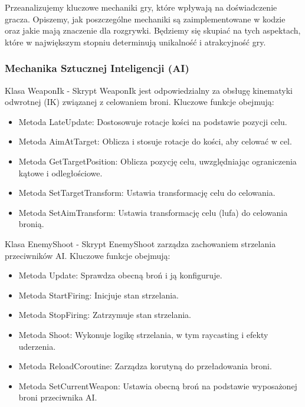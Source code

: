 Przeanalizujemy kluczowe mechaniki gry, które wpływają na doświadczenie gracza. Opiszemy, jak poszczególne mechaniki są zaimplementowane w kodzie oraz jakie mają znaczenie dla rozgrywki. Będziemy się skupiać na tych aspektach, które w największym stopniu determinują unikalność i atrakcyjność gry.

\subsubsection{Mechanika Sztucznej Inteligencji (AI)}

Klasa WeaponIk -
Skrypt WeaponIk jest odpowiedzialny za obsługę kinematyki odwrotnej (IK) związanej z celowaniem broni. Kluczowe funkcje obejmują:
\begin{itemize}
\item Metoda LateUpdate: Dostosowuje rotacje kości na podstawie pozycji celu.
\item Metoda AimAtTarget: Oblicza i stosuje rotacje do kości, aby celować w cel.
\item Metoda GetTargetPosition: Oblicza pozycję celu, uwzględniając ograniczenia kątowe i odległościowe.
\item Metoda SetTargetTransform: Ustawia transformację celu do celowania.
\item Metoda SetAimTransform: Ustawia transformację celu (lufa) do celowania bronią.
\end{itemize}

Klasa EnemyShoot -
Skrypt EnemyShoot zarządza zachowaniem strzelania przeciwników AI. Kluczowe funkcje obejmują:
\begin{itemize}
\item Metoda Update: Sprawdza obecną broń i ją konfiguruje.
\item Metoda StartFiring: Inicjuje stan strzelania.
\item Metoda StopFiring: Zatrzymuje stan strzelania.
\item Metoda Shoot: Wykonuje logikę strzelania, w tym raycasting i efekty uderzenia.
\item Metoda ReloadCoroutine: Zarządza korutyną do przeładowania broni.
\item Metoda SetCurrentWeapon: Ustawia obecną broń na podstawie wyposażonej broni przeciwnika AI.
\end{itemize}

